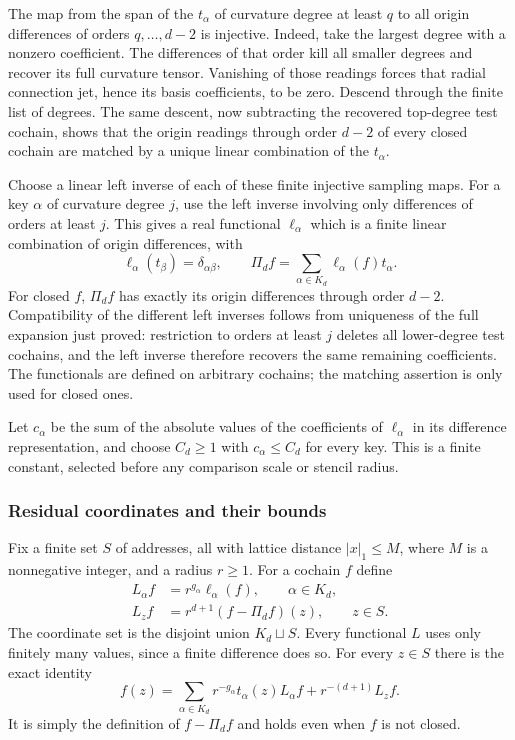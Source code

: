 The map from the span of the $t_\alpha$ of curvature degree at
least $q$ to all origin differences of orders $q,\ldots,d-2$
is injective. Indeed, take the largest degree with a nonzero
coefficient. The differences of that order kill all smaller
degrees and recover its full curvature tensor. Vanishing of those
readings forces that radial connection jet, hence its basis
coefficients, to be zero. Descend through the finite list of
degrees. The same descent, now subtracting the recovered top-degree
test cochain, shows that the origin readings through order $d-2$
of every closed cochain are matched by a unique linear combination
of the $t_\alpha$.

Choose a linear left inverse of each of these finite injective
sampling maps. For a key $\alpha$ of curvature degree $j$, use the
left inverse involving only differences of orders at least $j$.
This gives a real functional $\ell_\alpha$ which is a finite
linear combination of origin differences, with
\begin{equation}\label{eq:allarity-dual-cochain}
 \ell_\alpha(t_\beta)=\delta_{\alpha\beta},\qquad
 \Pi_df=\sum_{\alpha\in K_d}\ell_\alpha(f)t_\alpha.
\end{equation}
For closed $f$, $\Pi_df$ has exactly its origin differences through
order $d-2$. Compatibility of the different left inverses follows
from uniqueness of the full expansion just proved: restriction to
orders at least $j$ deletes all lower-degree test cochains, and
the left inverse therefore recovers the same remaining coefficients.
The functionals are defined on arbitrary cochains; the matching
assertion is only used for closed ones.

Let $c_\alpha$ be the sum of the absolute values of the coefficients
of $\ell_\alpha$ in its difference representation, and choose
$C_d\ge1$ with $c_\alpha\le C_d$ for every key. This is a finite
constant, selected before any comparison scale or stencil radius.

\subsubsection{Residual coordinates and their bounds}

Fix a finite set $S$ of addresses, all with lattice distance
$|x|_1\le M$, where $M$ is a nonnegative integer, and a radius $r\ge1$.
For a cochain $f$ define
\begin{align*}
 L_\alpha f&=r^{g_\alpha}\ell_\alpha(f),\qquad \alpha\in K_d,\\
 L_z f&=r^{d+1}(f-\Pi_df)(z),\qquad z\in S.
\end{align*}
The coordinate set is the disjoint union $K_d\sqcup S$. Every
functional $L$ uses only finitely many values, since a finite
difference does so. For every $z\in S$ there is the exact identity
\begin{equation}\label{eq:allarity-coordinate-reconstruction}
 f(z)=\sum_{\alpha\in K_d}r^{-g_\alpha}t_\alpha(z)L_\alpha f
                                      +r^{-(d+1)}L_zf.
\end{equation}
It is simply the definition of $f-\Pi_df$ and holds even when $f$
is not closed.

